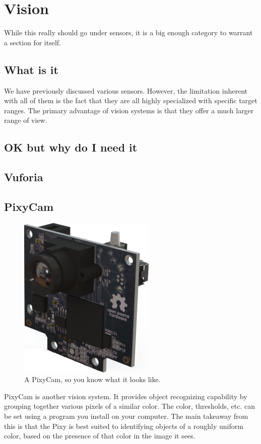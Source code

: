 \documentclass[../main.tex]{subfiles}
\begin{document}
\newpage
\section{Vision}
While this really should go under sensors, it is a big enough category to warrant a section for itself.

\subsection{What is it}
We have previously discussed various sensors. However, the limitation inherent with all of them is the fact that they are all highly specialized with specific target ranges. The primary advantage of vision systems is that they offer a much larger range of view.
\subsection{OK but why do I need it}
\subsection{Vuforia}
\subsection{PixyCam}
\begin{figure}[H]
    \includegraphics{sections/vision/images/pixy.png}
    \caption{A PixyCam, so you know what it looks like.}
\end{figure}
PixyCam is another vision system. It provides object recognizing capability by grouping together various pixels of a similar color. The color, thresholds, etc. can be set using a program you install on your computer. The main takeaway from this is that the Pixy is best suited to identifying objects of a roughly uniform color, based on the presence of that color in the image it sees.
\end{document}
